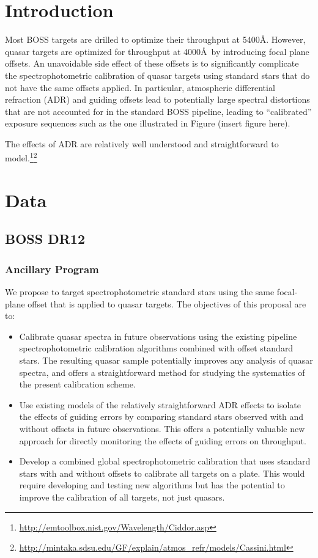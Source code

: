 \documentclass[preprint2]{aastex}
\begin{document}
\section{Introduction}

Most BOSS targets are drilled to optimize their throughput at 5400\AA. However, quasar targets are optimized for throughput at 4000\AA~by introducing focal plane offsets. An unavoidable side effect of these offsets is to significantly complicate the spectrophotometric calibration of quasar targets using standard stars that do not have the same offsets applied. In particular, atmospheric differential refraction (ADR) and guiding offsets lead to potentially large spectral distortions that are not accounted for in the standard BOSS pipeline, leading to ``calibrated'' exposure sequences such as the one illustrated in Figure (insert figure here).

The effects of ADR are relatively well understood and straightforward to model.\footnote{\url{http://emtoolbox.nist.gov/Wavelength/Ciddor.asp}}\footnote{\url{http://mintaka.sdsu.edu/GF/explain/atmos_refr/models/Cassini.html}}

\section{Data}

\subsection{BOSS DR12}

\subsubsection{Ancillary Program}

We propose to target spectrophotometric standard stars using the same focal-plane offset that is applied to quasar targets. The objectives of this proposal are to:

\begin{itemize}
\item Calibrate quasar spectra in future observations using the existing pipeline spectrophotometric calibration algorithms combined with offset standard stars. The resulting quasar sample potentially improves any analysis of quasar spectra, and offers a straightforward method for studying the systematics of the present calibration scheme.
\item Use existing models of the relatively straightforward ADR effects to isolate the effects of guiding errors by comparing standard stars observed with and without offsets in future observations. This offers a potentially valuable new approach for directly monitoring the effects of guiding errors on throughput.
\item Develop a combined global spectrophotometric calibration that uses standard stars with and without offsets to calibrate all targets on a plate. This would require developing and testing new algorithms but has the potential to improve the calibration of all targets, not just quasars.
\end{itemize}
\end{document}
